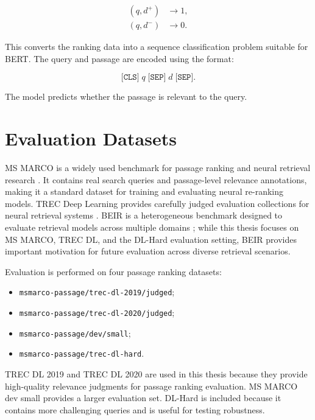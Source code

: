\begin{align}
    (q,d^+) &\rightarrow 1, \\
    (q,d^-) &\rightarrow 0.
\end{align}

This converts the ranking data into a sequence classification problem suitable for BERT. The query and passage are encoded using the format:

\begin{equation}
    \texttt{[CLS]} \; q \; \texttt{[SEP]} \; d \; \texttt{[SEP]}.
\end{equation}

The model predicts whether the passage is relevant to the query.

\section{Evaluation Datasets}
\label{sec:experiments_evaluation_datasets}

MS MARCO is a widely used benchmark for passage ranking and neural retrieval research \cite{nguyen2016msmarco}. It contains real search queries and passage-level relevance annotations, making it a standard dataset for training and evaluating neural re-ranking models. TREC Deep Learning provides carefully judged evaluation collections for neural retrieval systems \cite{craswell2020overview}. BEIR is a heterogeneous benchmark designed to evaluate retrieval models across multiple domains \cite{thakur2021beir}; while this thesis focuses on MS MARCO, TREC DL, and the DL-Hard evaluation setting, BEIR provides important motivation for future evaluation across diverse retrieval scenarios.

Evaluation is performed on four passage ranking datasets:

\begin{itemize}
    \item \texttt{msmarco-passage/trec-dl-2019/judged};
    \item \texttt{msmarco-passage/trec-dl-2020/judged};
    \item \texttt{msmarco-passage/dev/small};
    \item \texttt{msmarco-passage/trec-dl-hard}.
\end{itemize}

TREC DL 2019 and TREC DL 2020 are used in this thesis because they provide high-quality relevance judgments for passage ranking evaluation. MS MARCO dev small provides a larger evaluation set. DL-Hard is included because it contains more challenging queries and is useful for testing robustness.

